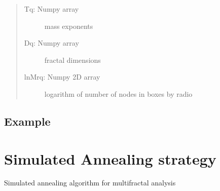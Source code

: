 \documentclass[letterpaper,10pt,english]{sphinxmanual}
\begin{document}
\begin{fulllineitems}
\begin{quote}
\begin{description}
\begin{description}
\item[{Tq: Numpy array}] \leavevmode
mass exponents

\item[{Dq: Numpy array}] \leavevmode
fractal dimensions

\item[{lnMrq: Numpy 2D array}] \leavevmode
logarithm of number of nodes in boxes by radio

\end{description}


\end{description}\end{quote}

\end{fulllineitems}



\subsection{Example}
\label{\detokenize{SBAlgorithm:example}}
%
\begin{sphinxVerbatim}[commandchars=\\\{\}]
 
   
   
 

  
  
  
  
  
     

     
\end{sphinxVerbatim}
\sphinxresetverbatimhllines


\section{Simulated Annealing strategy}
\label{\detokenize{SimulatedAnnealing:simulated-annealing-strategy}}\label{\detokenize{SimulatedAnnealing::doc}}
Simulated annealing algorithm for multifractal analysis
\end{document}
